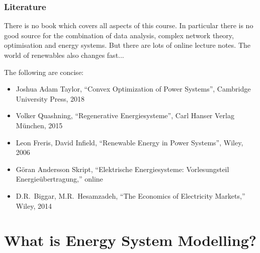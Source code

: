 \documentclass[10pt,aspectratio=169,dvipsnames]{beamer}
\let\olditem\item
\renewcommand{\item}{%
\olditem\vspace{5pt}}
\begin{document}
\begin{frame}
  \frametitle{Literature}


  There is no book which covers all aspects of this course. In particular there is no good source for the combination of data analysis, complex network theory, optimisation and energy systems. But there are lots of online lecture notes. The world of renewables also changes fast...

  The following are concise:
  \begin{itemize}
    \item Joshua Adam Taylor, ``Convex Optimization of Power Systems'', Cambridge University Press, 2018
  \item Volker Quashning, ``Regenerative Energiesysteme'', Carl Hanser Verlag München, 2015
      \item      Leon Freris, David Infield, ``Renewable Energy in Power Systems'', Wiley, 2006
      \item Göran Andersson Skript, ``Elektrische Energiesysteme: Vorlesungsteil Energieübertragung,'' online
          \item D.R.~Biggar, M.R.~Hesamzadeh, ``The Economics of Electricity
  Markets,'' Wiley, 2014
  \end{itemize}

\end{frame}




\section{What is Energy System Modelling?}
\end{document}
